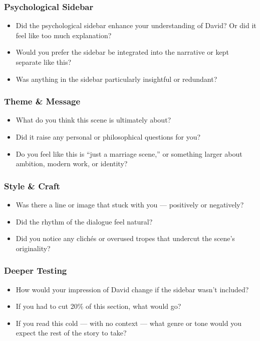 \subsubsection{Psychological Sidebar}

\begin{itemize}
  \item Did the psychological sidebar enhance your understanding of David? Or did it feel like too much explanation?
  \item Would you prefer the sidebar be integrated into the narrative or kept separate like this?
  \item Was anything in the sidebar particularly insightful or redundant?
\end{itemize}

\subsubsection{Theme \& Message}

\begin{itemize}
  \item What do you think this scene is ultimately about?
  \item Did it raise any personal or philosophical questions for you?
  \item Do you feel like this is “just a marriage scene,” or something larger about ambition, modern work, or identity?
\end{itemize}

\subsubsection{Style \& Craft}

\begin{itemize}
  \item Was there a line or image that stuck with you — positively or negatively?
  \item Did the rhythm of the dialogue feel natural?
  \item Did you notice any clichés or overused tropes that undercut the scene’s originality?
\end{itemize}

\subsubsection{Deeper Testing}

\begin{itemize}
  \item How would your impression of David change if the sidebar wasn’t included?
  \item If you had to cut 20\% of this section, what would go?
  \item If you read this cold — with no context — what genre or tone would you expect the rest of the story to take?
\end{itemize}

